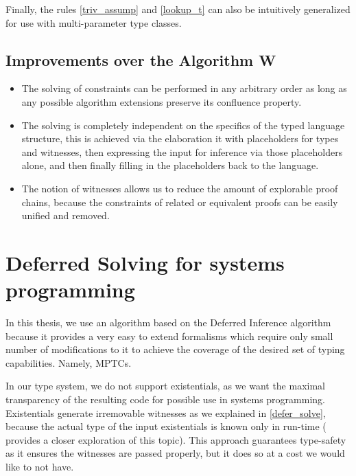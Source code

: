 Finally, the rules \ref{triv_assump} and \ref{lookup_t} can also be intuitively generalized for use with multi-parameter type classes.

\subsection{Improvements over the Algorithm W}


\begin{itemize}
    \item  The solving of constraints can be performed in any arbitrary order as long as any possible algorithm extensions preserve its confluence property.

    \item The solving is completely independent on the specifics of the typed language structure, this is achieved via the elaboration it with placeholders for types and witnesses, then expressing the input for inference via those placeholders alone, and then finally filling in the placeholders back to the language.

    \item The notion of witnesses allows us to reduce the amount of explorable proof chains, because the constraints of related or equivalent proofs can be easily unified and removed.
\end{itemize}


\section{Deferred Solving for systems programming}
\label{sys_defer}

In this thesis, we use an algorithm based on the Deferred Inference algorithm because it provides a very easy to extend formalisms which require only small number of modifications to it to achieve the coverage of the desired set of typing capabilities. Namely, MPTCs.

In our type system, we do not support existentials, as we want the maximal transparency of the resulting code for possible use in systems programming. Existentials generate irremovable witnesses as we explained in \cref{defer_solve}, because the actual type of the input existentials is known only in run-time (\citet{grossman2002existential} provides a closer exploration of this topic). This approach guarantees type-safety as it ensures the witnesses are passed properly, but it does so at a cost we would like to not have.

